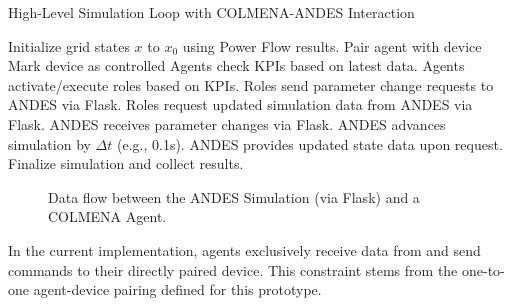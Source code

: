 \documentclass{article}
\begin{document}
\begin{algorithm}
    \caption{High-Level Simulation Loop with COLMENA-ANDES Interaction}
    \label{algo:COLMENAANDES}
    \begin{algorithmic}[1]
        \State Initialize grid states $x$ to $x_0$ using Power Flow results.
                    \State Pair agent with device
                    \State Mark device as controlled
                \EndIf
            \EndFor
        \EndFor
            \State Agents check KPIs based on latest data.
            \State Agents activate/execute roles based on KPIs.
            \State Roles send parameter change requests to ANDES via Flask.
            \State Roles request updated simulation data from ANDES via Flask.
            \State ANDES receives parameter changes via Flask.
            \State ANDES advances simulation by $\Delta t$ (e.g., 0.1s).
            \State ANDES provides updated state data upon request.
        \EndWhile
        \State Finalize simulation and collect results.
    \end{algorithmic}
\end{algorithm}

\begin{figure}[h]
    \centering
    \caption{Data flow between the ANDES Simulation (via Flask) and a COLMENA Agent.}
    \label{fig:sim_agent_interaction}
\end{figure}

In the current implementation, agents exclusively receive data from and send commands to their directly paired device. This constraint stems from the one-to-one agent-device pairing defined for this prototype.
\end{document}
